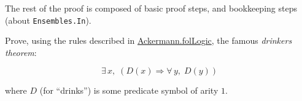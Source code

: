 
The rest of the proof is composed of basic proof steps, 
and bookkeeping steps (about \texttt{Ensembles.In}).


\begin{exercise}
Prove, using the rules described in 
 \href{../theories/html/hydras.Ackermann.folLogic.html}{Ackermann.folLogic}, the famous \emph{drinkers theorem}:

$$\exists\,x,\; (D(x)\Longrightarrow \forall\,y,\; D(y))$$
\end{exercise}

where $D$ (for ``drinks'') is some predicate symbol of arity $1$.



